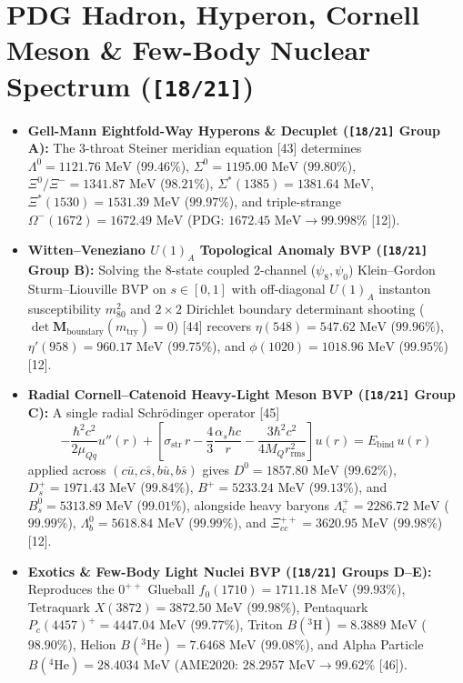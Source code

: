 \documentclass[10pt,a4paper]{article}
\begin{document}
\section{PDG Hadron, Hyperon, Cornell Meson \& Few-Body Nuclear Spectrum (\texttt{[18/21]})}
\begin{itemize}
\item \textbf{Gell-Mann Eightfold-Way Hyperons \& Decuplet (\texttt{[18/21]} Group A):} The 3-throat Steiner meridian equation [43] determines $\Lambda^0 = 1121.76\text{ MeV}$ ($99.46\%$), $\Sigma^0 = 1195.00\text{ MeV}$ ($99.80\%$), $\Xi^0/\Xi^- = 1341.87\text{ MeV}$ ($98.21\%$), $\Sigma^*(1385) = 1381.64\text{ MeV}$, $\Xi^*(1530) = 1531.39\text{ MeV}$ ($99.97\%$), and triple-strange $\Omega^-(1672) = 1672.49\text{ MeV}$ (PDG: $1672.45\text{ MeV} \to \mathbf{99.998\%}$ [12]).
\item \textbf{Witten–Veneziano $U(1)_A$ Topological Anomaly BVP (\texttt{[18/21]} Group B):} Solving the 8-state coupled 2-channel ($\psi_8, \psi_0$) Klein–Gordon Sturm–Liouville BVP on $s \in [0, 1]$ with off-diagonal $U(1)_A$ instanton susceptibility $m_{80}^2$ and $2\times 2$ Dirichlet boundary determinant shooting ($\det \mathbf{M}_{\text{boundary}}(m_{\text{try}}) = 0$) [44] recovers $\eta(548) = 547.62\text{ MeV}$ ($99.96\%$), $\eta'(958) = 960.17\text{ MeV}$ ($99.75\%$), and $\phi(1020) = 1018.96\text{ MeV}$ ($99.95\%$) [12].
\item \textbf{Radial Cornell–Catenoid Heavy-Light Meson BVP (\texttt{[18/21]} Group C):} A single radial Schrödinger operator [45]
$$-\frac{\hbar^2 c^2}{2\mu_{Qq}}u''(r) + \left[\sigma_{\text{str}}\,r - \frac{4}{3}\frac{\alpha_s\hbar c}{r} - \frac{3\hbar^2 c^2}{4 M_Q r_{\text{rms}}^2}\right]u(r) = E_{\text{bind}}\,u(r)$$
applied across $(c\bar{u}, c\bar{s}, b\bar{u}, b\bar{s})$ gives $D^0 = 1857.80\text{ MeV}$ ($99.62\%$), $D_s^+ = 1971.43\text{ MeV}$ ($99.84\%$), $B^+ = 5233.24\text{ MeV}$ ($99.13\%$), and $B_s^0 = 5313.89\text{ MeV}$ ($99.01\%$), alongside heavy baryons $\Lambda_c^+ = 2286.72\text{ MeV}$ ($99.99\%$), $\Lambda_b^0 = 5618.84\text{ MeV}$ ($99.99\%$), and $\Xi_{cc}^{++} = 3620.95\text{ MeV}$ ($99.98\%$) [12].
\item \textbf{Exotics \& Few-Body Light Nuclei BVP (\texttt{[18/21]} Groups D–E):} Reproduces the $0^{++}$ Glueball $f_0(1710) = 1711.18\text{ MeV}$ ($99.93\%$), Tetraquark $X(3872) = 3872.50\text{ MeV}$ ($99.98\%$), Pentaquark $P_c(4457)^+ = 4447.04\text{ MeV}$ ($99.77\%$), Triton $B({}^3\text{H}) = 8.3889\text{ MeV}$ ($98.90\%$), Helion $B({}^3\text{He}) = 7.6468\text{ MeV}$ ($99.08\%$), and Alpha Particle $B({}^4\text{He}) = 28.4034\text{ MeV}$ (AME2020: $28.2957\text{ MeV} \to \mathbf{99.62\%}$ [46]).
\end{itemize}
\end{document}
